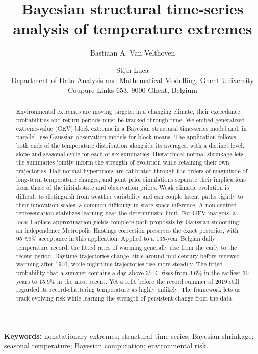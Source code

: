 \documentclass[11pt,a4paper]{article}
\title{Bayesian structural time-series analysis of temperature extremes}
\author{Bastiaan A. Van Velthoven \and Stijn Luca\\[3pt]
	\small Department of Data Analysis and Mathematical Modelling, Ghent University\\
	\small Coupure Links 653, 9000 Ghent, Belgium}
\date{}
\newcommand{\Cdeg}{\,^\circ\mathrm{C}}
\begin{document}
	\maketitle
	
	
	\begin{abstract}
		Environmental extremes are moving targets: in a changing climate, their exceedance probabilities and return periods must be tracked through time. We embed generalized extreme-value (GEV) block extrema in a Bayesian structural time-series model and, in parallel, use Gaussian observation models for block means. The application follows both ends of the temperature distribution alongside its averages, with a distinct level, slope and seasonal cycle for each of six summaries. Hierarchical normal shrinkage lets the summaries jointly inform the strength of evolution while retaining their own trajectories. Half-normal hyperpriors are calibrated through the orders of magnitude of long-term temperature changes, and joint prior simulations separate their implications from those of the initial-state and observation priors. Weak climatic evolution is difficult to distinguish from weather variability and can couple latent paths tightly to their innovation scales, a common difficulty in state-space inference. A non-centred representation stabilizes learning near the deterministic limit. For GEV margins, a local Laplace approximation yields complete-path proposals by Gaussian smoothing; an independence Metropolis--Hastings correction preserves the exact posterior, with 95--99\% acceptance in this application. Applied to a 135-year Belgian daily temperature record, the fitted rates of warming generally rise from the early to the recent period. Daytime trajectories change little around mid-century before renewed warming after 1970, while nighttime trajectories rise more steadily. The fitted probability that a summer contains a day above \(35\Cdeg\) rises from 3.6\% in the earliest 30 years to 15.9\% in the most recent. Yet a refit before the record summer of 2019 still regarded its record-shattering temperature as highly unlikely. The framework lets us track evolving risk while learning the strength of persistent change from the data.
	\end{abstract}
	
	
	\noindent\textbf{Keywords:} nonstationary extremes; structural time series; Bayesian shrinkage; seasonal temperature; Bayesian computation; environmental risk.
	
	
	
	
	
\end{document}
